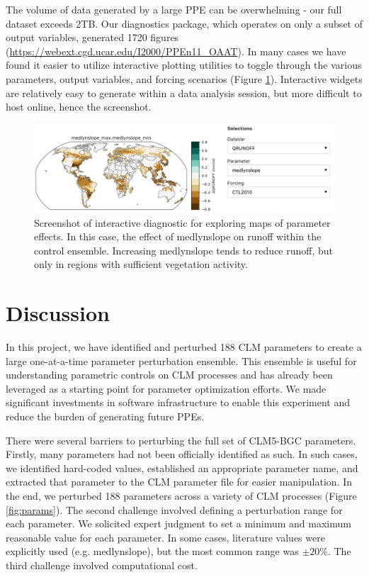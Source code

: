 \documentclass[draft]{agujournal2019}
\begin{document}
The volume of data generated by a large PPE can be overwhelming - our full dataset exceeds 2TB.  Our diagnostics package, which operates on only a subset of output variables, generated 1720 figures (\url{https://webext.cgd.ucar.edu/I2000/PPEn11_OAAT}). In many cases we have found it easier to utilize interactive plotting utilities to toggle through the various parameters, output variables, and forcing scenarios (Figure \ref{fig:panel}). Interactive widgets are relatively easy to generate within a data analysis session, but more difficult to host online, hence the screenshot.

\begin{figure}[h]
\centering
\includegraphics[width=\textwidth]{../figs/deltmap_panel.pdf}
\caption{Screenshot of interactive diagnostic for exploring maps of parameter effects. In this case, the effect of medlynslope on runoff within the control ensemble. Increasing medlynslope tends to reduce runoff, but only in regions with sufficient vegetation activity.}
\label{fig:panel}
\end{figure}

\section{Discussion}

In this project, we have identified and perturbed 188 CLM parameters to create a large one-at-a-time parameter perturbation ensemble. This ensemble is useful for understanding parametric controls on CLM processes and has already been leveraged as a starting point for parameter optimization efforts. We made significant investments in software infrastructure to enable this experiment and reduce the burden of generating future PPEs.

There were several barriers to perturbing the full set of CLM5-BGC parameters. Firstly, many parameters had not been officially identified as such. In such cases, we identified hard-coded values, established an appropriate parameter name, and extracted that parameter to the CLM parameter file for easier manipulation. In the end, we perturbed 188 parameters across a variety of CLM processes (Figure \ref{fig:params}). The second challenge involved defining a perturbation range for each parameter. We solicited expert judgment to set a minimum and maximum reasonable value for each parameter. In some cases, literature values were explicitly used (e.g. medlynslope), but the most common range was $\pm20\%$. The third challenge involved computational cost.
\end{document}
